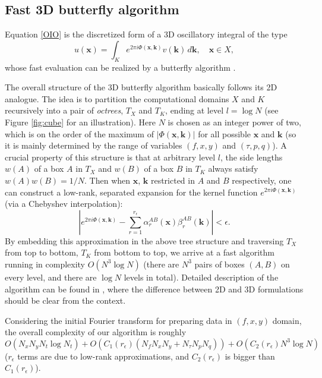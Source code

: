 \subsection{Fast 3D butterfly algorithm}

Equation \ref{OIO} is the discretized form of a 3D oscillatory integral of the type
\begin{equation} 
u(\mathbf{x})=\int_K e^{ 2\pi i
\Phi(\mathbf{x},\mathbf{k})}v(\mathbf{k}) \,d\mathbf{k},\quad \mathbf{x}\in X, 
\end{equation}
whose fast evaluation can be realized by a butterfly algorithm \citep{CDY09}. 

The overall structure of the 3D butterfly algorithm basically follows its 2D analogue. The idea is to partition the computational domains $X$ and $K$ recursively into a pair of {\it octrees}, $T_X$ and $T_K$, ending at level $l=\log N$ (see Figure \ref{fig:cube} for an illustration). Here $N$ is chosen as an integer power of two, which is on the order of the maximum of $|\Phi(\mathbf{x},\mathbf{k})|$ for all possible $\mathbf{x}$ and $\mathbf{k}$ (so it is mainly determined by the range of variables $(f,x,y)$ and $(\tau,p,q)$). A crucial property of this structure is that at arbitrary level $l$, the side lengths $w(A)$ of a box $A$ in $T_X$ and $w(B)$ of a box $B$ in $T_K$ always satisfy $w(A)w(B)=1/N$. Then when $\mathbf{x}$, $\mathbf{k}$ restricted in $A$ and $B$ respectively, one can construct a low-rank, separated expansion for the kernel function $e^{2\pi i\Phi(\mathbf{x},\mathbf{k})}$ (via a Chebyshev interpolation):
\begin{equation} \label{lowrank}
\left |e^{2\pi i \Phi(\mathbf{x},\mathbf{k})} -\sum_{r=1}^{r_{\epsilon}}\alpha_r^{AB}(\mathbf{x})\beta_r^{AB}(\mathbf{k})\right|<\epsilon.
\end{equation}
By embedding this approximation in the above tree structure and traversing $T_X$ from top to bottom, $T_K$ from bottom to top, we arrive at a fast algorithm running in complexity $O(N^3\log N)$ (there are $N^3$ pairs of boxes $(A,B)$ on every level, and there are $\log N$ levels in total). Detailed description of the algorithm can be found in \cite{HFDY13}, where the difference between 2D and 3D formulations should be clear from the context.


Considering the initial Fourier transform for preparing data in $(f,x,y)$ domain, the overall complexity of our algorithm is roughly $O(N_xN_yN_t\log N_t)+ O(C_1(r_{\epsilon})(N_fN_xN_y+N_{\tau}N_pN_q))+O(C_2(r_{\epsilon})N^3\log N)$ ($r_{\epsilon}$ terms are due to low-rank approximations, and $C_2(r_{\epsilon})$ is bigger than $C_1(r_{\epsilon})$).

